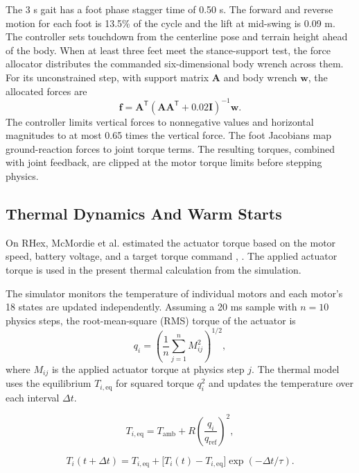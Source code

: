 \documentclass{ieeeaccess}
\begin{document}
The 3 s gait has a foot phase stagger time of 0.50 s. The forward and reverse motion for each foot is 13.5\% of the cycle and the lift at mid-swing is 0.09 m. The controller sets touchdown from the centerline pose and terrain height ahead of the body. When at least three feet meet the stance-support test, the force allocator distributes the commanded six-dimensional body wrench across them. For its unconstrained step, with support matrix $\mathbf{A}$ and body wrench $\mathbf{w}$, the allocated forces are
\begin{equation}
\mathbf{f}=\mathbf{A}^{\mathsf T}
   \left(\mathbf{A}\mathbf{A}^{\mathsf T}
    +0.02\mathbf{I}\right)^{-1}\mathbf{w}.
\end{equation}
The controller limits vertical forces to nonnegative values and horizontal magnitudes to at most 0.65 times the vertical force. The foot Jacobians map ground-reaction forces to joint torque terms. The resulting torques, combined with joint feedback, are clipped at the motor torque limits before stepping physics.

\subsection{Thermal Dynamics And Warm Starts}

On RHex, McMordie et al. estimated the actuator torque based on the motor speed, battery voltage, and a target torque command \cite{mcmordie2003}, \cite{hwangbo2019}. The applied actuator torque is used in the present thermal calculation from the simulation.

The simulator monitors the temperature of individual motors and each motor's 18 states are updated independently. Assuming a 20 ms sample with $n=10$ physics steps, the root-mean-square (RMS) torque of the actuator is
\begin{equation}
q_i=\left(\frac{1}{n}\sum_{j=1}^n M_{ij}^2\right)^{1/2},
\end{equation}
where $M_{ij}$ is the applied actuator torque at physics step $j$. The thermal model uses the equilibrium $T_{i,\mathrm{eq}}$ for squared torque $q_i^2$ and updates the temperature over each interval $\Delta t$.

\begin{equation}
T_{i,\mathrm{eq}} = T_{\mathrm{amb}} + R\left(\frac{q_i}{q_{\mathrm{ref}}}\right)^2 ,
\label{eq:equilibrium}
\end{equation}

\begin{equation}
T_i(t+\Delta t) = T_{i,\mathrm{eq}} +
\bigl[T_i(t)-T_{i,\mathrm{eq}}\bigr]\exp(-\Delta t/\tau).
\label{eq:thermal-update}
\end{equation}
\end{document}
